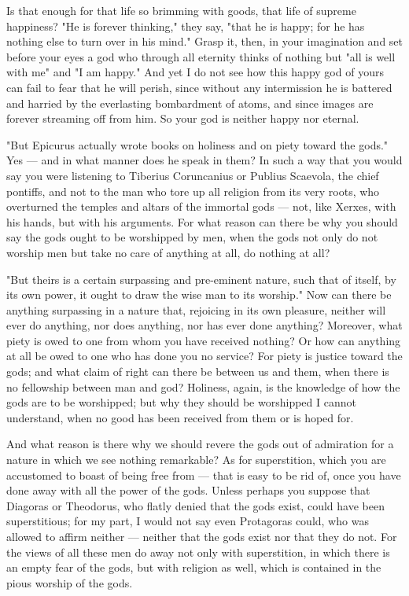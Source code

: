  Is that enough for that life so brimming with goods, that life of supreme happiness? "He is forever thinking," they say, "that he is happy; for he has nothing else to turn over in his mind." Grasp it, then, in your imagination and set before your eyes a god who through all eternity thinks of nothing but "all is well with me" and "I am happy." And yet I do not see how this happy god of yours can fail to fear that he will perish, since without any intermission he is battered and harried by the everlasting bombardment of atoms, and since images are forever streaming off from him. So your god is neither happy nor eternal.

 "But Epicurus actually wrote books on holiness and on piety toward the gods." Yes — and in what manner does he speak in them? In such a way that you would say you were listening to Tiberius Coruncanius or Publius Scaevola, the chief pontiffs, and not to the man who tore up all religion from its very roots, who overturned the temples and altars of the immortal gods — not, like Xerxes, with his hands, but with his arguments. For what reason can there be why you should say the gods ought to be worshipped by men, when the gods not only do not worship men but take no care of anything at all, do nothing at all?

 "But theirs is a certain surpassing and pre-eminent nature, such that of itself, by its own power, it ought to draw the wise man to its worship." Now can there be anything surpassing in a nature that, rejoicing in its own pleasure, neither will ever do anything, nor does anything, nor has ever done anything? Moreover, what piety is owed to one from whom you have received nothing? Or how can anything at all be owed to one who has done you no service? For piety is justice toward the gods; and what claim of right can there be between us and them, when there is no fellowship between man and god? Holiness, again, is the knowledge of how the gods are to be worshipped; but why they should be worshipped I cannot understand, when no good has been received from them or is hoped for.

 And what reason is there why we should revere the gods out of admiration for a nature in which we see nothing remarkable? As for superstition, which you are accustomed to boast of being free from — that is easy to be rid of, once you have done away with all the power of the gods. Unless perhaps you suppose that Diagoras or Theodorus, who flatly denied that the gods exist, could have been superstitious; for my part, I would not say even Protagoras could, who was allowed to affirm neither — neither that the gods exist nor that they do not. For the views of all these men do away not only with superstition, in which there is an empty fear of the gods, but with religion as well, which is contained in the pious worship of the gods.

